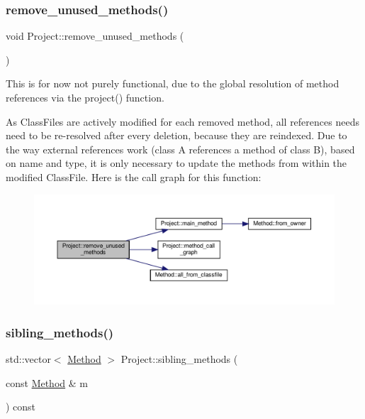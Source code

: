 \subsubsection{\texorpdfstring{remove\+\_\+unused\+\_\+methods()}{remove\_unused\_methods()}}
{\footnotesize\ttfamily void Project\+::remove\+\_\+unused\+\_\+methods (\begin{DoxyParamCaption}{ }\end{DoxyParamCaption})}

This is for now not purely functional, due to the global resolution of method references via the {\ttfamily project()} function.

As Class\+Files are actively modified for each removed method, all references needs need to be re-\/resolved after every deletion, because they are reindexed. Due to the way external references work (class A references a method of class B), based on name and type, it is only necessary to update the methods from within the modified Class\+File. Here is the call graph for this function\+:\nopagebreak
\begin{figure}[H]
\begin{center}
\leavevmode
\includegraphics[width=350pt]{classProject_af5f35c59d1175af1cfa659a597bb6353_cgraph}
\end{center}
\end{figure}
\mbox{\label{classProject_afee58125bfee1c7a1871be7805e855fa}} 
\subsubsection{\texorpdfstring{sibling\+\_\+methods()}{sibling\_methods()}}
{\footnotesize\ttfamily std\+::vector$<$ \hyperlink{classMethod}{Method} $>$ Project\+::sibling\+\_\+methods (\begin{DoxyParamCaption}\item[{const \hyperlink{classMethod}{Method} \&}]{m }\end{DoxyParamCaption}) const}

